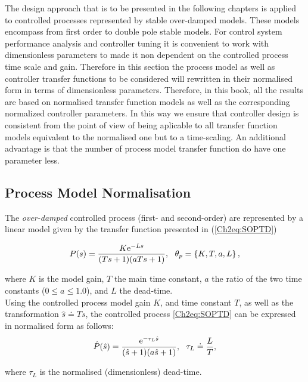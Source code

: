 The design approach that is to be presented in the following chapters is applied to controlled processes represented by stable over-damped models. These models encompass from first order to double pole stable models. For control system performance analysis and controller tuning it is convenient to work with dimensionless parameters to made it non dependent on the controlled process time scale and gain. Therefore in this section the process model as well as controller transfer functions to be considered will rewritten in their normalised form in terms of dimensionless parameters.  Therefore, in this book, all the results are based on normalised transfer function models as well as the corresponding normalized controller parameters. In this way we ensure that controller design is consistent from the point of view of being aplicable to all transfer function models equivalent to the normalised one but to a time-scaling.  An additional advantage is that the number of process model transfer function do have one parameter less.\\

\subsection{Process Model Normalisation}
\label{sec:3.2}

The \emph{over-damped} controlled process (first- and second-order) are represented by a linear model given by the transfer function presented in (\ref{Ch2eq:SOPTD})

\begin{equation}
	P(s) = \frac{K \mathrm{e}^{-L s}}{(T s+1)(a T s+1)}, \ \ \theta_p=\left\{K, T, a, L \right\}, 
\end{equation}

\noindent where $K$ is the model gain, $T$ the main time constant, $a$ the ratio of the two time constants ($0 \leq a \leq 1.0$), and $L$ the dead-time.\\

Using the controlled process model gain $K$, and time constant $T$, as well as the transformation $\hat s \doteq T s$, the controlled process \eqref{Ch2eq:SOPTD} can be expressed in normalised form as follows:
\begin{equation}
	\hat P(\hat s) = \frac{\mathrm{e}^{-\tau_L \hat s}}{(\hat s +1)(a \hat s +1)}, \ \ \tau_L \doteq \frac{L}{T}, 
	\label{Ch2eq:SOPTD_n}
\end{equation}

\noindent where $\tau_L$ is the normalised (dimensionless) dead-time.\\

